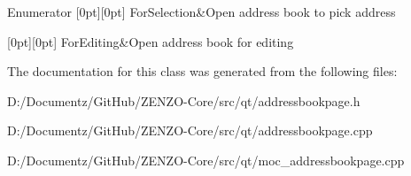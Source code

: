 \begin{DoxyEnumFields}{Enumerator}
[0pt][0pt]{}\mbox{\label{class_address_book_page_a0a8f8e590dc6f18e829fde039f984464aaadd19edc662b5516c378a7cc8599fdb}} 
For\+Selection&Open address book to pick address \\
\hline

[0pt][0pt]{}\mbox{\label{class_address_book_page_a0a8f8e590dc6f18e829fde039f984464a86b6565fcddce6edf578c0e470471296}} 
For\+Editing&Open address book for editing \\
\hline

\end{DoxyEnumFields}


The documentation for this class was generated from the following files\+:\begin{DoxyCompactItemize}
\item 
D\+:/\+Documentz/\+Git\+Hub/\+Z\+E\+N\+Z\+O-\/\+Core/src/qt/addressbookpage.\+h\item 
D\+:/\+Documentz/\+Git\+Hub/\+Z\+E\+N\+Z\+O-\/\+Core/src/qt/addressbookpage.\+cpp\item 
D\+:/\+Documentz/\+Git\+Hub/\+Z\+E\+N\+Z\+O-\/\+Core/src/qt/moc\+\_\+addressbookpage.\+cpp\end{DoxyCompactItemize}
